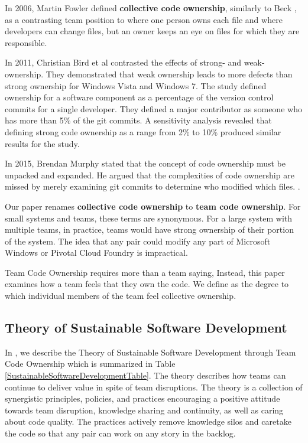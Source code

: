 In 2006, Martin Fowler defined \textbf{collective code ownership}, similarly to Beck \cite{FowlerCodeOwnership}, as a contrasting team position to  where one person owns each file and  where developers can change files, but an owner keeps an eye on files for which they are responsible. 

In 2011, Christian Bird et al \cite{BirdDontTouchMyCode} contrasted the effects of strong- and weak-ownership. They demonstrated that weak ownership leads to more defects than strong ownership for Windows Vista and Windows 7. The study defined ownership for a software component as a percentage of the version control commits for a single developer. They defined a major contributor as someone who has more than 5\% of the git commits. A sensitivity analysis revealed that defining strong code ownership as a range from 2\% to 10\% produced similar results for the study.

In 2015, Brendan Murphy stated that the concept of code ownership must be unpacked and expanded. He argued that the complexities of code ownership are missed by merely examining git commits to determine who modified which files. \cite{MurphyIEEESoftware}.

Our paper renames \textbf{collective code ownership} to \textbf{team code ownership}. For small systems and teams, these terms are synonymous. For a large system with multiple teams, in practice, teams would have strong ownership of their portion of the system. The idea that any pair could modify any part of Microsoft Windows or Pivotal Cloud Foundry is impractical.

Team Code Ownership requires more than a team saying,  Instead, this paper examines how a team feels that they own the code. We define  as the degree to which individual members of the team feel collective ownership.  
\subsection{Theory of Sustainable Software Development}
\label{SustainableSoftwareDevelopmentTheory}
In \cite{SustainableSoftwareDevelopment}, we describe the Theory of Sustainable Software Development through Team Code Ownership which is summarized in Table \ref{SustainableSoftwareDevelopmentTable}. The theory describes how teams can continue to deliver value in spite of team disruptions. The theory is a collection of synergistic principles, policies, and practices encouraging a positive attitude towards team disruption, knowledge sharing and continuity, as well as caring about code quality. The practices actively remove knowledge silos and caretake the code so that any pair can work on any story in the backlog. 

